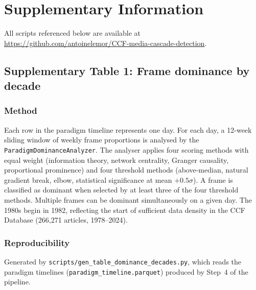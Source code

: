 \documentclass[11pt]{article}
\begin{document}
\newpage



\newpage


\begingroup\sloppy

\newpage
\setcounter{table}{0}
\renewcommand{\tablename}{Supplementary Table}

\section*{Supplementary Information}

All scripts referenced below are available at\\
\url{https://github.com/antoinelemor/CCF-media-cascade-detection}.


\subsection*{Supplementary Table 1: Frame dominance by decade}



\subsubsection*{Method}
Each row in the paradigm timeline represents one day. For each day, a 12-week sliding window of weekly frame proportions is analysed by the \texttt{ParadigmDominanceAnalyzer}. The analyser applies four scoring methods with equal weight (information theory, network centrality, Granger causality, proportional prominence) and four threshold methods (above-median, natural gradient break, elbow, statistical significance at mean $+ 0.5\sigma$). A frame is classified as dominant when selected by at least three of the four threshold methods. Multiple frames can be dominant simultaneously on a given day. The 1980s begin in 1982, reflecting the start of sufficient data density in the CCF Database (266,271 articles, 1978--2024).

\subsubsection*{Reproducibility}
Generated by \texttt{scripts/gen\_table\_dominance\_decades.py}, which reads the paradigm timelines (\texttt{paradigm\_timeline.parquet}) produced by Step~4 of the pipeline.
\end{document}
